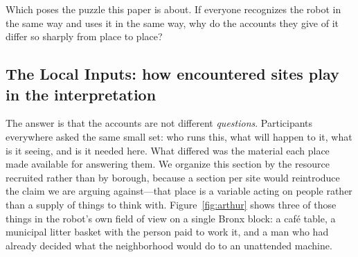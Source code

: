 Which poses the puzzle this paper is about. If everyone recognizes the robot in
the same way and uses it in the same way, why do the accounts they give of it
differ so sharply from place to place?

\subsection{The Local Inputs: how encountered sites play in the interpretation}
\label{sec:inputs}

The answer is that the accounts are not different \emph{questions}. Participants
everywhere asked the same small set: who runs this, what will happen to it, what
is it seeing, and is it needed here. What differed was the material each place
made available for answering them. We organize this section by the resource
recruited rather than by borough, because a section per site would reintroduce
the claim we are arguing against---that place is a variable acting on people
rather than a supply of things to think with. Figure~\ref{fig:arthur} shows
three of those things in the robot's own field of view on a single Bronx
block: a caf\'e table, a municipal litter basket with the person paid to work
it, and a man who had already decided what the neighborhood would do to an
unattended machine.

